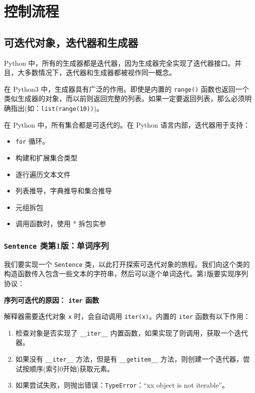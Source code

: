 \chapter{控制流程}
\section{可迭代对象，迭代器和生成器}

Python 中，所有的生成器都是迭代器，因为生成器完全实现了迭代器接口。并且，大多数情况下，迭代器和生成器都被视作同一概念。

在 Python3 中，生成器具有广泛的作用。即使是内置的 \texttt{range()} 函数也返回一个类似生成器的对象，而以前则返回完整的列表。如果一定要返回列表，那么必须明确指出(如：\texttt{list(range(10))})。

在 Python 中，所有集合都是可迭代的。在 Python 语言内部，迭代器用于支持：
\begin{itemize}
    \item \texttt{for} 循环。
    \item 构建和扩展集合类型
    \item 逐行遍历文本文件
    \item 列表推导，字典推导和集合推导
    \item 元组拆包
    \item 调用函数时，使用 * 拆包实参
\end{itemize}

\subsection{\texttt{Sentence} 类第1版：单词序列}

我们要实现一个 \texttt{Sentence} 类，以此打开探索可迭代对象的旅程。我们向这个类的构造函数传入包含一些文本的字符串，然后可以逐个单词迭代。第1版要实现序列协议：



\noindent\textbf{序列可迭代的原因： \texttt{iter} 函数}

解释器需要迭代对象 \texttt{x} 时，会自动调用 \texttt{iter(x)}。内置的 \texttt{iter} 函数有以下作用：

\begin{enumerate}
    \item 检查对象是否实现了 \texttt{\_\_iter\_\_} 内置函数，如果实现了则调用，获取一个迭代器。
    \item 如果没有 \texttt{\_\_iter\_\_} 方法，但是有 \texttt{\_\_getitem\_\_} 方法，则创建一个迭代器，尝试按顺序(索引0开始)获取元素。
    \item 如果尝试失败，则抛出错误：\texttt{TypeError}：``xx object is not iterable''。
\end{enumerate}

